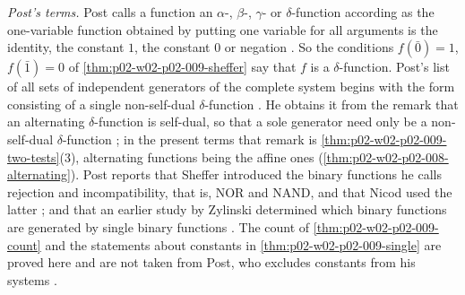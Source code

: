 \emph{Post's terms.}  Post calls a function an \(\alpha\)-, \(\beta\)-,
\(\gamma\)- or \(\delta\)-function according as the one-variable function
obtained by putting one variable for all arguments is the identity, the
constant \(1\), the constant \(0\) or negation \cite[\S\,10,
p.~43]{Post1941}.  So the conditions \(f(\bar0)=1\), \(f(\bar1)=0\) of
\cref{thm:p02-w02-p02-009-sheffer} say that \(f\) is a
\(\delta\)-function.  Post's list of all sets of independent generators of
the complete system begins with the form consisting of a single
non-self-dual \(\delta\)-function \cite[\S\,26, p.~107]{Post1941}.  He
obtains it from the remark that an alternating \(\delta\)-function is
self-dual, so that a sole generator need only be a non-self-dual
\(\delta\)-function \cite[\S\,26, p.~108]{Post1941}; in the present terms
that remark is \cref{thm:p02-w02-p02-009-two-tests}(3), alternating
functions being the affine ones (\cref{thm:p02-w02-p02-008-alternating}).
Post reports that Sheffer introduced the binary functions he calls
rejection and incompatibility, that is, NOR and NAND, and that Nicod used the
latter \cite[\S\,26, p.~117]{Post1941}; and that an earlier study by
Zylinski determined which binary functions are generated by single binary
functions \cite[Introduction, p.~6]{Post1941}.  The count of
\cref{thm:p02-w02-p02-009-count} and the statements about constants in
\cref{thm:p02-w02-p02-009-single} are proved here and are not taken from
Post, who excludes constants from his systems
\cite[Introduction, p.~2, n.~5]{Post1941}.
